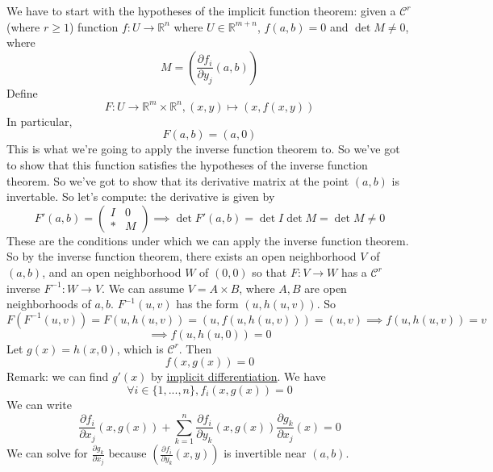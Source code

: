 \documentclass{article}
\newcommand{\reals}[0]{\mathbb{R}}
\newcommand{\mc}[1]{\mathcal{#1}}
\newcommand{\prt}[2]{\frac{\partial #1}{\partial #2}}
\begin{document}
We have to start with the hypotheses of the implicit function theorem: given a \(\mc{C}^r\) (where \(r \geq 1\)) function
\(f: U \to \reals^n\)
where \(U \in \reals^{m + n}\), \(f(a, b) = 0\) and \(\det M \neq 0\), where
\begin{equation}M = \left(\prt{f_i}{y_j}(a, b)\right)\end{equation}
Define
\begin{equation}F: U \to \reals^m\times\reals^n, (x, y) \mapsto (x, f(x, y))\end{equation}
In particular,
\begin{equation}F(a, b) = (a, 0)\end{equation}
This is what we're going to apply the inverse function theorem to. So we've got to show that this function satisfies the hypotheses of the inverse function theorem. So we've got to show that its derivative matrix at the point \((a, b)\) is invertable. So let's compute: the derivative is given by
\begin{equation}F'(a, b) = \left(\begin{array}{c|c} I & 0 \\ \hline * & M \end{array}\right) \implies \det F'(a, b) = \det I \det M = \det M \neq 0\end{equation}
These are the conditions under which we can apply the inverse function theorem. So by the inverse function theorem, there exists an open neighborhood \(V\) of \((a, b)\), and an open neighborhood \(W\) of \((0, 0)\) so that \(F: V \to W\) has a \(\mc{C}^r\) inverse
\(F^{-1}: W \to V\). We can assume \(V = A \times B\), where \(A, B\) are open neighborhoods of \(a, b\). \(F^{-1}(u, v)\) has the form \((u, h(u, v))\). So
\begin{equation}F(F^{-1}(u, v)) = F(u, h(u, v)) = (u, f(u, h(u, v))) = (u, v) \implies f(u, h(u, v)) = v\end{equation}
\begin{equation}\implies f(u, h(u, 0)) = 0\end{equation}
Let \(g(x) = h(x, 0)\), which is \(\mc{C}^r\). Then
\begin{equation}f(x, g(x)) = 0\end{equation}
Remark: we can find \(g'(x)\) by \underline{implicit differentiation}. We have
\begin{equation}\forall i \in \{1,...,n\}, f_i(x, g(x)) = 0\end{equation}
We can write
\begin{equation}\prt{f_i}{x_j}(x, g(x)) + \sum_{k = 1}^n\prt{f_i}{y_k}(x, g(x))\prt{g_k}{x_j}(x) = 0\end{equation}
We can solve for \(\prt{g_k}{x_j}\) because \(\left(\prt{f_i}{y_k}(x, y)\right)\) is invertible near \((a, b)\).
\end{document}
